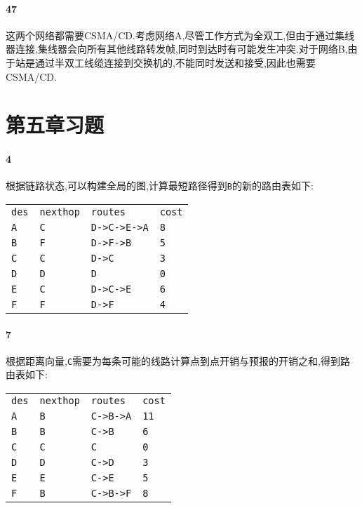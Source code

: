 \documentclass[a4paper]{article}
\begin{document}
\paragraph{47}
这两个网络都需要CSMA/CD.考虑网络A,尽管工作方式为全双工,但由于通过集线器连接,集线器会向所有其他线路转发帧,同时到达时有可能发生冲突.对于网络B,由于站是通过半双工线缆连接到交换机的,不能同时发送和接受,因此也需要CSMA/CD.
\section{第五章习题}
\paragraph{4}
根据链路状态,可以构建全局的图,计算最短路径得到\verb|B|的新的路由表如下:
\begin{table}[H]
    \begin{tabular}{|llll|}
        \hline
        \verb|des| & \verb|nexthop| & \verb|routes|     & \verb|cost| \\
        \verb|A|   & \verb|C|       & \verb|D->C->E->A| & \verb|8|    \\
        \verb|B|   & \verb|F|       & \verb|D->F->B|    & \verb|5|    \\
        \verb|C|   & \verb|C|       & \verb|D->C|       & \verb|3|    \\
        \verb|D|   & \verb|D|       & \verb|D|          & \verb|0|    \\
        \verb|E|   & \verb|C|       & \verb|D->C->E|    & \verb|6|    \\
        \verb|F|   & \verb|F|       & \verb|D->F|       & \verb|4|    \\ \hline
    \end{tabular}
\end{table}
\paragraph{7}
根据距离向量,\verb|C|需要为每条可能的线路计算点到点开销与预报的开销之和,得到路由表如下:
\begin{table}[H]
    \begin{tabular}{|llll|}
        \hline
        \verb|des| & \verb|nexthop| & \verb|routes|  & \verb|cost| \\
        \verb|A|   & \verb|B|       & \verb|C->B->A| & \verb|11|   \\
        \verb|B|   & \verb|B|       & \verb|C->B|    & \verb|6|    \\
        \verb|C|   & \verb|C|       & \verb|C|       & \verb|0|    \\
        \verb|D|   & \verb|D|       & \verb|C->D|    & \verb|3|    \\
        \verb|E|   & \verb|E|       & \verb|C->E|    & \verb|5|    \\
        \verb|F|   & \verb|B|       & \verb|C->B->F| & \verb|8|    \\ \hline
    \end{tabular}
\end{table}
\end{document}
